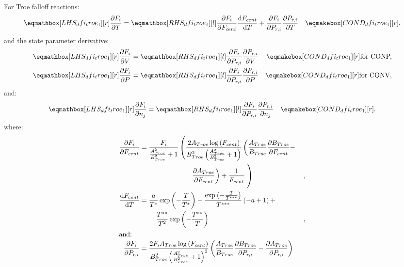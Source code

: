 \documentclass[12pt,number,sort&compress]{elsarticle}
\newcommand{\conp}{CONP}
\newcommand{\conv}{CONV}
\newcommand{\dconp}{\ifmmode\text{for \conp,}\else for \conp,\fi}
\newcommand{\dconv}{\ifmmode\text{for \conv,}\else for \conv,\fi}
\begin{document}
For Troe falloff reactions:
\begin{align}
 \lhs{dfi_troe_1}{\frac{\partial F_{i} }{\partial T }} &= \rhs{dfi_troe_1}{\frac{\partial F_{i} }{\partial F_{cent} } \frac{\text{d} F_{cent} }{\text{d} T } + \frac{\partial F_{i} }{\partial P_{r, i} } \frac{\partial P_{r, i} }{\partial T }} & \cond{dfi_troe_1}{,} \label{e:dfi_troe_dt}
\end{align}
and the state parameter derivative:
\begin{subequations}
 \label{e:dfi_troe_de}
 \begin{align}
 \lhs{dfi_troe_1}{\frac{\partial F_{i} }{\partial V }} &= \rhs{dfi_troe_1}{\frac{\partial F_{i} }{\partial P_{r, i} } \frac{\partial P_{r, i} }{\partial V }} & \cond{dfi_troe_1}{\dconp} \\
 \lhs{dfi_troe_1}{\frac{\partial F_{i} }{\partial P }} &= \rhs{dfi_troe_1}{\frac{\partial F_{i} }{\partial P_{r, i} } \frac{\partial P_{r, i} }{\partial P }} & \cond{dfi_troe_1}{\dconv}
 \end{align}
\end{subequations}
and:
\begin{align}
 \lhs{dfi_troe_1}{\frac{\partial F_{i} }{\partial n_j}} &= \rhs{dfi_troe_1}{\frac{\partial F_{i} }{\partial P_{r, i} } \frac{\partial P_{r, i} }{\partial n_j }} & \cond{dfi_troe_1}{.} \label{e:dfi_troe_dnj}
\end{align}
where:
\begin{align}
 \frac{\partial F_{i} }{\partial F_{cent} } &= \frac{F_{i}}{\frac{A_{Troe}^{2}}{B_{Troe}^{2}} + 1} \left(\frac{2 A_{Troe} \log{\left (F_{cent} \right )}}{B_{Troe}^{2} \left(\frac{A_{Troe}^{2}}{B_{Troe}^{2}} + 1\right)} \left(\frac{A_{Troe}}{B_{Troe}} \frac{\partial B_{Troe} }{\partial F_{cent} } - \right. \right. & \nonumber \\
 & \mathindent[morespaceplease] \left. \frac{\partial A_{Troe} }{\partial F_{cent} }\right) + \frac{1}{F_{cent}} \left. \vphantom{\frac{F_{i}}{\frac{A_{Troe}^{2}}{B_{Troe}^{2}} + 1}} \right) & \text{,} \label{e:dfi_troe_dfcent_partial} \\
\frac{\text{d} F_{cent} }{\text{d} T } &= \frac{a}{T^{*}} \operatorname{exp}\left({- \frac{T}{T^{*}}}\right) - \frac{\operatorname{exp}\left({- \frac{T}{T^{***}}}\right)}{T^{***}} \left(- a + 1\right) + & \nonumber \\
 & \mathindent \frac{T^{**}}{T^{2}} \operatorname{exp}\left({- \frac{T^{**}}{T}}\right) & \text{,} \label{e:dfcent_dt} \\
\intertext{and:}
\frac{\partial F_{i} }{\partial P_{r, i} } &= \frac{2 F_{i} A_{Troe} \log{\left (F_{cent} \right )}}{B_{Troe}^{2} \left(\frac{A_{Troe}^{2}}{B_{Troe}^{2}} + 1\right)^{2}} \left(\frac{A_{Troe}}{B_{Troe}} \frac{\partial B_{Troe} }{\partial P_{r, i} } - \frac{\partial A_{Troe} }{\partial P_{r, i} }\right) \label{e:dfi_troe_dpr_partial}
\end{align}
\end{document}

